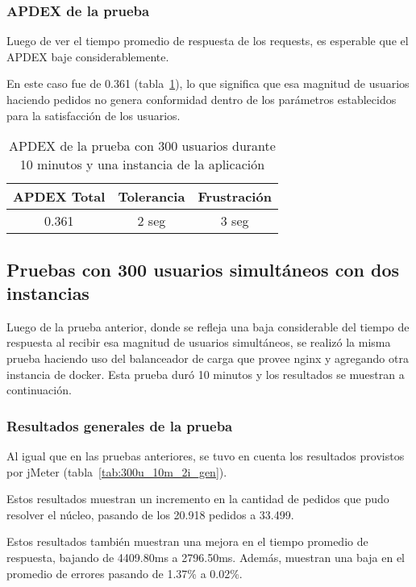 \subsubsection{APDEX de la prueba}

Luego de ver el tiempo promedio de respuesta de los requests, es esperable que el APDEX baje considerablemente.

En este caso fue de 0.361 (tabla~\ref{tab:300u_10m_apdex}), lo que significa que esa magnitud de usuarios haciendo pedidos no genera conformidad dentro de los parámetros establecidos para la satisfacción de los usuarios.

\begin{table}[!htbp]
    \centering
    \makegapedcells
    \begin{tabular}{|c|c|c|}
    \hline
    APDEX Total & Tolerancia & Frustración\\ \hline
    0.361 & 2 seg & 3 seg \\ \hline
    \end{tabular}
    \caption{APDEX de la prueba con 300 usuarios durante 10 minutos y una instancia de la aplicación}
    \label{tab:300u_10m_apdex}
\end{table}


\subsection{Pruebas con 300 usuarios simultáneos con dos instancias}
Luego de la prueba anterior, donde se refleja una baja considerable del tiempo de respuesta al recibir esa magnitud de usuarios simultáneos, se realizó la misma prueba haciendo uso del balanceador de carga que provee nginx y agregando otra instancia de docker.
Esta prueba duró 10 minutos y los resultados se muestran a continuación.

\subsubsection{Resultados generales de la prueba}

Al igual que en las pruebas anteriores, se tuvo en cuenta los resultados provistos por jMeter (tabla~\ref{tab:300u_10m_2i_gen}).

Estos resultados muestran un incremento en la cantidad de pedidos que pudo resolver el núcleo, pasando de los 20.918 pedidos a 33.499.

Estos resultados también muestran una mejora en el tiempo promedio de respuesta, bajando de 4409.80ms a 2796.50ms. Además, muestran una baja en el promedio de errores pasando de 1.37\% a 0.02\%.


